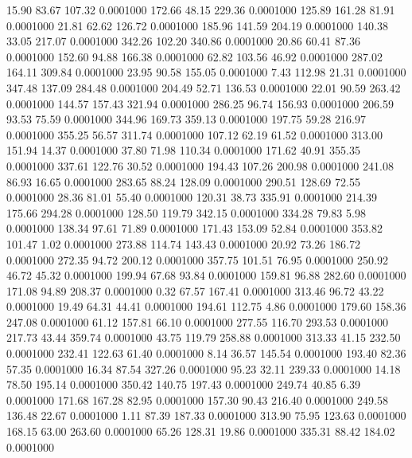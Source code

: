   15.90   83.67  107.32   0.0001000
 172.66   48.15  229.36   0.0001000
 125.89  161.28   81.91   0.0001000
  21.81   62.62  126.72   0.0001000
 185.96  141.59  204.19   0.0001000
 140.38   33.05  217.07   0.0001000
 342.26  102.20  340.86   0.0001000
  20.86   60.41   87.36   0.0001000
 152.60   94.88  166.38   0.0001000
  62.82  103.56   46.92   0.0001000
 287.02  164.11  309.84   0.0001000
  23.95   90.58  155.05   0.0001000
   7.43  112.98   21.31   0.0001000
 347.48  137.09  284.48   0.0001000
 204.49   52.71  136.53   0.0001000
  22.01   90.59  263.42   0.0001000
 144.57  157.43  321.94   0.0001000
 286.25   96.74  156.93   0.0001000
 206.59   93.53   75.59   0.0001000
 344.96  169.73  359.13   0.0001000
 197.75   59.28  216.97   0.0001000
 355.25   56.57  311.74   0.0001000
 107.12   62.19   61.52   0.0001000
 313.00  151.94   14.37   0.0001000
  37.80   71.98  110.34   0.0001000
 171.62   40.91  355.35   0.0001000
 337.61  122.76   30.52   0.0001000
 194.43  107.26  200.98   0.0001000
 241.08   86.93   16.65   0.0001000
 283.65   88.24  128.09   0.0001000
 290.51  128.69   72.55   0.0001000
  28.36   81.01   55.40   0.0001000
 120.31   38.73  335.91   0.0001000
 214.39  175.66  294.28   0.0001000
 128.50  119.79  342.15   0.0001000
 334.28   79.83    5.98   0.0001000
 138.34   97.61   71.89   0.0001000
 171.43  153.09   52.84   0.0001000
 353.82  101.47    1.02   0.0001000
 273.88  114.74  143.43   0.0001000
  20.92   73.26  186.72   0.0001000
 272.35   94.72  200.12   0.0001000
 357.75  101.51   76.95   0.0001000
 250.92   46.72   45.32   0.0001000
 199.94   67.68   93.84   0.0001000
 159.81   96.88  282.60   0.0001000
 171.08   94.89  208.37   0.0001000
   0.32   67.57  167.41   0.0001000
 313.46   96.72   43.22   0.0001000
  19.49   64.31   44.41   0.0001000
 194.61  112.75    4.86   0.0001000
 179.60  158.36  247.08   0.0001000
  61.12  157.81   66.10   0.0001000
 277.55  116.70  293.53   0.0001000
 217.73   43.44  359.74   0.0001000
  43.75  119.79  258.88   0.0001000
 313.33   41.15  232.50   0.0001000
 232.41  122.63   61.40   0.0001000
   8.14   36.57  145.54   0.0001000
 193.40   82.36   57.35   0.0001000
  16.34   87.54  327.26   0.0001000
  95.23   32.11  239.33   0.0001000
  14.18   78.50  195.14   0.0001000
 350.42  140.75  197.43   0.0001000
 249.74   40.85    6.39   0.0001000
 171.68  167.28   82.95   0.0001000
 157.30   90.43  216.40   0.0001000
 249.58  136.48   22.67   0.0001000
   1.11   87.39  187.33   0.0001000
 313.90   75.95  123.63   0.0001000
 168.15   63.00  263.60   0.0001000
  65.26  128.31   19.86   0.0001000
 335.31   88.42  184.02   0.0001000
